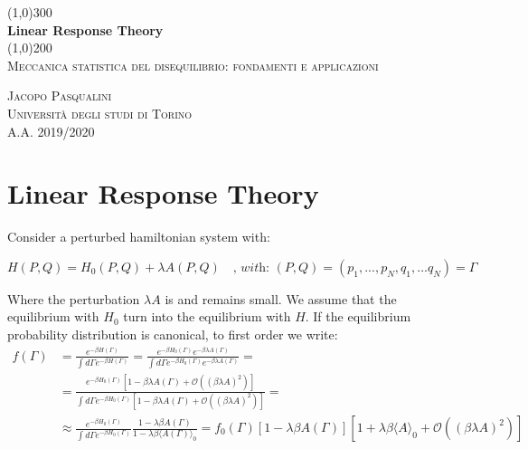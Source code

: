 \documentclass{article}
\begin{document}
\begin{titlepage}
	\begin{center}
	
	\line(1,0){300}\\
	[5mm]
	\huge{\bfseries Linear Response Theory}\\
	[2mm]
	\line(1,0){200}\\
	[2cm]
	\textsc{\Large Meccanica statistica del disequilibrio: fondamenti e applicazioni} \\
	[8cm]
	
	\end{center}
	
	\begin{flushright}
	\textsc{\LARGE Jacopo Pasqualini}\\
	[0.5cm]
	\textsc{\large Università degli studi di Torino\\
	[0.5cm]
	A.A. 2019/2020 }
	\end{flushright}
	
\end{titlepage}

\section{Linear Response Theory}\label{sec:langapp}

Consider a perturbed hamiltonian system with:

$$H(P,Q) = H_0(P,Q) + \lambda A(P,Q) \quad \textit{, with: } (P,Q) = (p_1,...,p_N,q_1,...q_N) = \Gamma$$

Where the perturbation $\lambda A$ is and remains small. We assume that the equilibrium with $H_0$ turn into the equilibrium with $H$. If the equilibrium probability distribution is canonical, to first order we write:
\begin{align*}
 f(\Gamma) &= \frac{ e^{-\beta H(\Gamma)} }{ \int d \Gamma e^{-\beta H(\Gamma)}} = \frac{ e^{-\beta H_0(\Gamma)} e^{-\beta \lambda A(\Gamma)} }{  \int d \Gamma e^{-\beta H_0(\Gamma)} e^{-\beta \lambda A(\Gamma)}} = \\
  &= \frac{ e^{-\beta H_0(\Gamma)}[ 1 - \beta \lambda A(\Gamma) + \mathcal{O}( (\beta \lambda A)^2) ] }{ \int d \Gamma e^{-\beta H_0(\Gamma)}[ 1 - \beta \lambda A(\Gamma) + \mathcal{O}( (\beta \lambda A)^2) ]} =  \\
   &\approx \frac{ e^{-\beta H_0(\Gamma)} }{ \int d \Gamma e^{-\beta H_0(\Gamma)} } \frac{1-\lambda \beta A(\Gamma) }{ 1-\lambda \beta  \langle A(\Gamma) \rangle_0} = f_0(\Gamma) [ 1 - \lambda \beta A(\Gamma) ][ 1 + \lambda \beta \langle A \rangle_0 + \mathcal{O}( (\beta \lambda A)^2) ]    
\end{align*}
\end{document}
